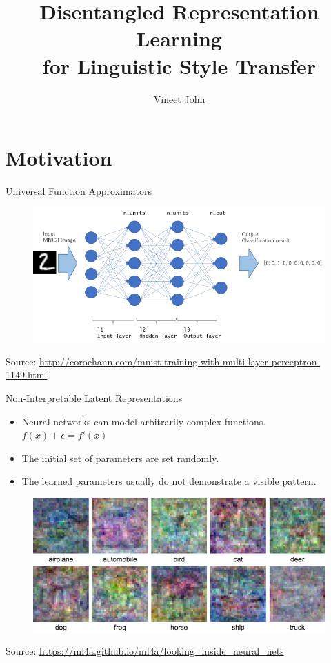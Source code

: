 \documentclass[aspectratio=169]{beamer}
\title{
	Disentangled Representation Learning\\
	for Linguistic Style Transfer}
\date{}
\author{Vineet John}
\institute{University of Waterloo}
\newcommand{\imgsrc}[1]{\tiny{Source: #1}}
\begin{document}
\maketitle
\graphicspath{{images/}}

\section{Motivation}

\begin{frame}{Universal Function Approximators}
	\centering
	\begin{figure}[ht]
		\includegraphics[width=\linewidth]{mlp-network}
	\end{figure}
	\imgsrc{\url{http://corochann.com/mnist-training-with-multi-layer-perceptron-1149.html}}
\end{frame}

\begin{frame}{Non-Interpretable Latent Representations}
	\begin{itemize}
		\item Neural networks can model arbitrarily complex functions. $f(x) + \epsilon = f'(x)$
		\item The initial set of parameters are set randomly.
		\item The learned parameters usually do not demonstrate a visible pattern.
	\end{itemize}

	\centering
	\begin{figure}[ht]
		\includegraphics[width=0.6\linewidth]{uninterpretable-weights}
	\end{figure}
	\imgsrc{\url{https://ml4a.github.io/ml4a/looking_inside_neural_nets}}
\end{frame}
\end{document}
